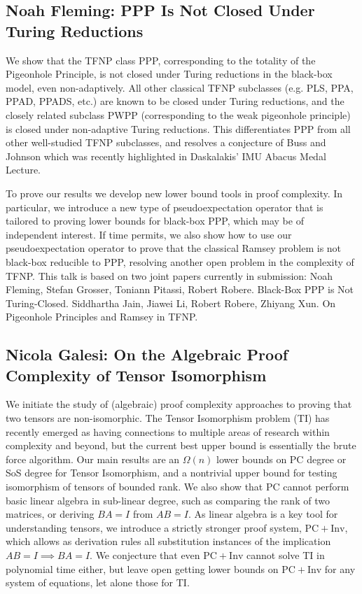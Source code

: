 \documentclass[11pt]{article}
\begin{document}
\subsection*{Noah Fleming: PPP Is Not Closed Under Turing Reductions}\label{Fleming}

We show that the TFNP class PPP, corresponding to the totality of the Pigeonhole Principle, is not closed under Turing reductions in the black-box model, even non-adaptively. All other classical TFNP subclasses (e.g. PLS, PPA, PPAD, PPADS, etc.) are known to be closed under Turing reductions, and the closely related subclass PWPP (corresponding to the weak pigeonhole principle) is closed under non-adaptive Turing reductions. This differentiates PPP from all other well-studied TFNP subclasses, and resolves a conjecture of Buss and Johnson which was recently highlighted in Daskalakis’ IMU Abacus Medal Lecture. 

To prove our results we develop new lower bound tools in proof complexity. In particular, we introduce a new type of pseudoexpectation operator that is tailored to proving lower bounds for black-box PPP, which may be of independent interest. If time permits, we also show how to use our pseudoexpectation operator to prove that the classical Ramsey problem is not black-box reducible to PPP, resolving another open problem in the complexity of TFNP. This talk is based on two joint papers currently in submission: Noah Fleming, Stefan Grosser, Toniann Pitassi, Robert Robere. Black-Box PPP is Not Turing-Closed. Siddhartha Jain, Jiawei Li, Robert Robere, Zhiyang Xun. On Pigeonhole Principles and Ramsey in TFNP.

\subsection*{Nicola Galesi: On the Algebraic Proof Complexity of Tensor Isomorphism}\label{Galesi}

We initiate the study of (algebraic) proof complexity approaches to proving that two tensors are non-isomorphic. The Tensor Isomorphism problem (TI) has recently emerged as having connections to multiple areas of research within complexity and beyond, but the current best upper bound is essentially the brute force algorithm. 
Our main results are an $\Omega(n)$ lower bounds on PC degree or SoS degree for Tensor Isomorphism, and a nontrivial upper bound for testing isomorphism of tensors of bounded rank.
We also show that PC cannot perform basic linear algebra in sub-linear degree, such as comparing the rank of two matrices, or deriving $BA = I$ from $AB = I$. As linear algebra is a key tool for understanding tensors, we introduce a strictly stronger proof system, $\mathrm{PC}+\mathrm{Inv}$, which allows as derivation rules all substitution instances of the implication $AB = I \implies BA = I$. We conjecture that even $\mathrm{PC}+\mathrm{Inv}$ cannot solve TI in polynomial time either, but leave open getting lower bounds on $\mathrm{PC}+\mathrm{Inv}$ for any system of equations, let alone those for TI. 
\end{document}
